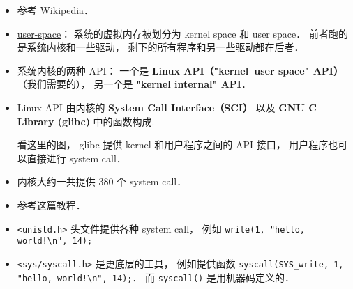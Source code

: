 
\begin{issues}
\issueDraft
\end{issues}

\begin{itemize}
\item 参考 \href{https://en.wikipedia.org/wiki/Linux_kernel_interfaces}{Wikipedia}．
\item \href{https://en.wikipedia.org/wiki/User_space_and_kernel_space}{user-space}： 系统的虚拟内存被划分为 kernel space 和 user space． 前者跑的是系统内核和一些驱动， 剩下的所有程序和另一些驱动都在后者．
\item 系统内核的两种 API： 一个是 \textbf{Linux API（"kernel–user space" API）}（我们需要的）， 另一个是 \textbf{"kernel internal" API}．
\item Linux API 由内核的 \textbf{System Call Interface（SCI）} 以及 \textbf{GNU C Library (glibc)} 中的函数构成.

看这里的图， glibc 提供 kernel 和用户程序之间的 API 接口， 用户程序也可以直接进行 system call．
\item 内核大约一共提供 380 个 system call．
\item 参考\href{https://jameshfisher.com/2018/02/19/how-to-syscall-in-c/}{这篇教程}．
\item \verb|<unistd.h>| 头文件提供各种 system call， 例如 \verb|write(1, "hello, world!\n", 14);|
\item \verb|<sys/syscall.h>| 是更底层的工具， 例如提供函数 \verb|syscall(SYS_write, 1, "hello, world!\n", 14);|． 而 \verb|syscall()| 是用机器码定义的．
\end{itemize}
